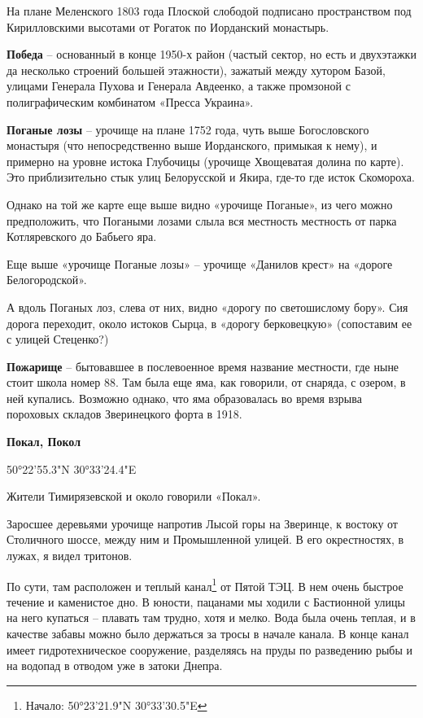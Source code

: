 На плане Меленского 1803 года Плоской слободой подписано пространством под Кирилловскими высотами от Рогаток по Иорданский монастырь.\\

\medskip

\textbf{Победа} – основанный в конце 1950-х район (частый сектор, но есть и двухэтажки да несколько строений большей этажности), зажатый между хутором Базой, улицами Генерала Пухова и Генерала Авдеенко, а также промзоной с полиграфическим комбинатом «Пресса Украина».\\ 


\medskip

\textbf{Поганые лозы} – урочище на плане 1752 года, чуть выше Богословского монастыря (что непосредственно выше Иорданского, примыкая к нему), и примерно на уровне истока Глубочицы (урочище Хвощеватая долина по карте). Это приблизительно стык улиц Белорусской и Якира, где-то где исток Скомороха.
  
   Однако на той же карте еще выше видно «урочище Поганые», из чего можно предположить, что Погаными лозами слыла вся местность местность от парка Котляревского до Бабьего яра.

    Еще выше «урочище Поганые лозы» – урочище «Данилов крест» на «дороге Белогородской». 

А вдоль Поганых лоз, слева от них, видно «дорогу по светошислому бору». Сия дорога переходит, около истоков Сырца, в «дорогу берковецкую» (сопоставим ее с улицей Стеценко?)

\medskip

\textbf{Пожарище} – бытовавшее в послевоенное время название местности, где ныне стоит школа номер 88. Там была еще яма, как говорили, от снаряда, с озером, в ней купались. Возможно однако, что яма образовалась во время взрыва пороховых складов Зверинецкого форта в 1918.\\

\medskip

\textbf{Покал, Покол} 

50°22'55.3"N 30°33'24.4"E

Жители Тимирязевской и около говорили «Покал».

Заросшее деревьями урочище напротив Лысой горы на Зверинце, к востоку от Столичного шоссе, между ним и Промышленной улицей. В его окрестностях, в лужах, я видел тритонов.

По сути, там расположен и теплый канал\footnote{Начало: 50°23'21.9"N 30°33'30.5"E} от Пятой ТЭЦ. В нем очень быстрое течение и каменистое дно. В юности, пацанами мы ходили с Бастионной улицы на него купаться – плавать там трудно, хотя и мелко. Вода была очень теплая, и в качестве забавы можно было держаться за тросы в начале канала. В конце канал имеет гидротехническое сооружение, разделяясь на пруды по разведению рыбы и на водопад в отводом уже в затоки Днепра.

